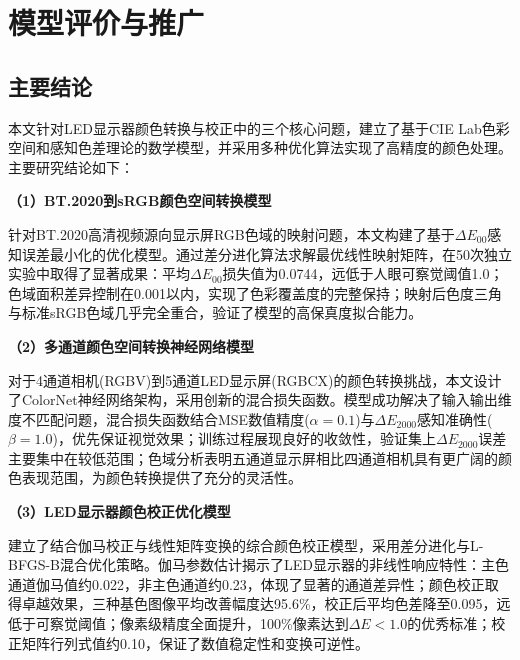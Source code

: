 \chapter[\hspace{0pt}模型评价与推广]{{\heiti{}\hspace{0pt}模型评价与推广}}\label{chapter4: 模型评价与推广}
\removelofgap
\removelotgap

\section[\hspace{-2pt}主要结论]{{\heiti{} \hspace{-8pt}主要结论}}\label{section5: 主要结论}

本文针对LED显示器颜色转换与校正中的三个核心问题，建立了基于CIE Lab色彩空间和感知色差理论的数学模型，并采用多种优化算法实现了高精度的颜色处理。主要研究结论如下：

\noindent\textbf{（1）BT.2020到sRGB颜色空间转换模型}

针对BT.2020高清视频源向显示屏RGB色域的映射问题，本文构建了基于$\Delta E_{00}$感知误差最小化的优化模型。通过差分进化算法求解最优线性映射矩阵，在50次独立实验中取得了显著成果：平均$\Delta E_{00}$损失值为0.0744，远低于人眼可察觉阈值1.0；色域面积差异控制在0.001以内，实现了色彩覆盖度的完整保持；映射后色度三角与标准sRGB色域几乎完全重合，验证了模型的高保真度拟合能力。

\noindent\textbf{（2）多通道颜色空间转换神经网络模型}

对于4通道相机(RGBV)到5通道LED显示屏(RGBCX)的颜色转换挑战，本文设计了ColorNet神经网络架构，采用创新的混合损失函数。模型成功解决了输入输出维度不匹配问题，混合损失函数结合MSE数值精度($\alpha=0.1$)与$\Delta E_{2000}$感知准确性($\beta=1.0$)，优先保证视觉效果；训练过程展现良好的收敛性，验证集上$\Delta E_{2000}$误差主要集中在较低范围；色域分析表明五通道显示屏相比四通道相机具有更广阔的颜色表现范围，为颜色转换提供了充分的灵活性。

\noindent\textbf{（3）LED显示器颜色校正优化模型}

建立了结合伽马校正与线性矩阵变换的综合颜色校正模型，采用差分进化与L-BFGS-B混合优化策略。伽马参数估计揭示了LED显示器的非线性响应特性：主色通道伽马值约0.022，非主色通道约0.23，体现了显著的通道差异性；颜色校正取得卓越效果，三种基色图像平均改善幅度达95.6\%，校正后平均色差降至0.095，远低于可察觉阈值；像素级精度全面提升，100\%像素达到$\Delta E<1.0$的优秀标准；校正矩阵行列式值约0.10，保证了数值稳定性和变换可逆性。

